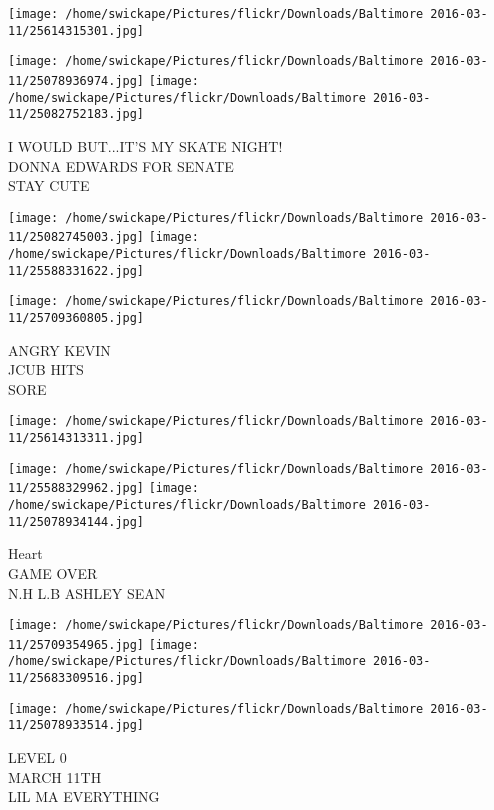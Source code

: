 \documentclass[10pt,letterpaper]{article}
\begin{document}
\texttt{[image: /home/swickape/Pictures/flickr/Downloads/Baltimore 2016-03-11/25614315301.jpg]}

\vspace{0.25in}
\texttt{[image: /home/swickape/Pictures/flickr/Downloads/Baltimore 2016-03-11/25078936974.jpg]}
\texttt{[image: /home/swickape/Pictures/flickr/Downloads/Baltimore 2016-03-11/25082752183.jpg]}

I WOULD BUT...IT'S MY SKATE NIGHT!\\
DONNA EDWARDS FOR SENATE\\
STAY CUTE\\
\pagebreak

\texttt{[image: /home/swickape/Pictures/flickr/Downloads/Baltimore 2016-03-11/25082745003.jpg]}
\texttt{[image: /home/swickape/Pictures/flickr/Downloads/Baltimore 2016-03-11/25588331622.jpg]}

\texttt{[image: /home/swickape/Pictures/flickr/Downloads/Baltimore 2016-03-11/25709360805.jpg]}

ANGRY KEVIN\\
JCUB HITS\\
SORE\\
\pagebreak

\texttt{[image: /home/swickape/Pictures/flickr/Downloads/Baltimore 2016-03-11/25614313311.jpg]}

\vspace{0.25in}
\texttt{[image: /home/swickape/Pictures/flickr/Downloads/Baltimore 2016-03-11/25588329962.jpg]}
\texttt{[image: /home/swickape/Pictures/flickr/Downloads/Baltimore 2016-03-11/25078934144.jpg]}

Heart\\
GAME OVER\\
N.H L.B ASHLEY SEAN\\
\pagebreak

\texttt{[image: /home/swickape/Pictures/flickr/Downloads/Baltimore 2016-03-11/25709354965.jpg]}
\texttt{[image: /home/swickape/Pictures/flickr/Downloads/Baltimore 2016-03-11/25683309516.jpg]}

\vspace{0.25in}
\texttt{[image: /home/swickape/Pictures/flickr/Downloads/Baltimore 2016-03-11/25078933514.jpg]}

LEVEL 0\\
MARCH 11TH\\
LIL MA EVERYTHING\\
\pagebreak
\end{document}
